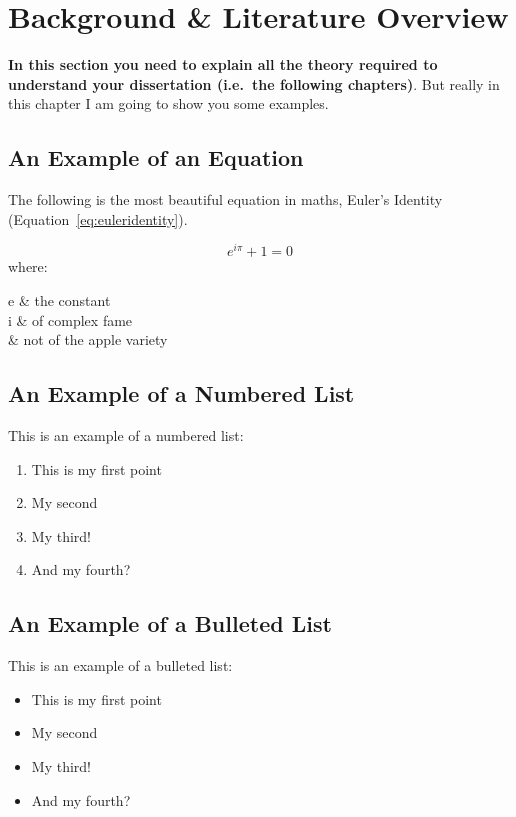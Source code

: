 \chapter{Background \& Literature Overview}
\textbf{In this section you need to explain all the theory required to understand your dissertation (i.e.\ the following chapters)}. But really in this chapter I am going to show you some examples.

\section{An Example of an Equation}

The following is the most beautiful equation in maths, Euler's Identity (Equation~\ref{eq:euleridentity}).

\begin{equation}\label{eq:euleridentity}
	e^{i\pi}+1=0
\end{equation}
where:
\begin{conditionsenv*}
	e 		& the constant \\
	i 		& of complex fame \\
	\pi		& not of the apple variety \\
\end{conditionsenv*}

\blindtext[2]

\section{An Example of a Numbered List}

This is an example of a numbered list:

\begin{enumerate}
	\item This is my first point
	\item My second
	\item My third!
	\item And my fourth?
\end{enumerate}

\blindtext

\section{An Example of a Bulleted List}

This is an example of a bulleted list:

\begin{itemize}
	\item This is my first point
	\item My second
	\item My third!
	\item And my fourth?
\end{itemize}


